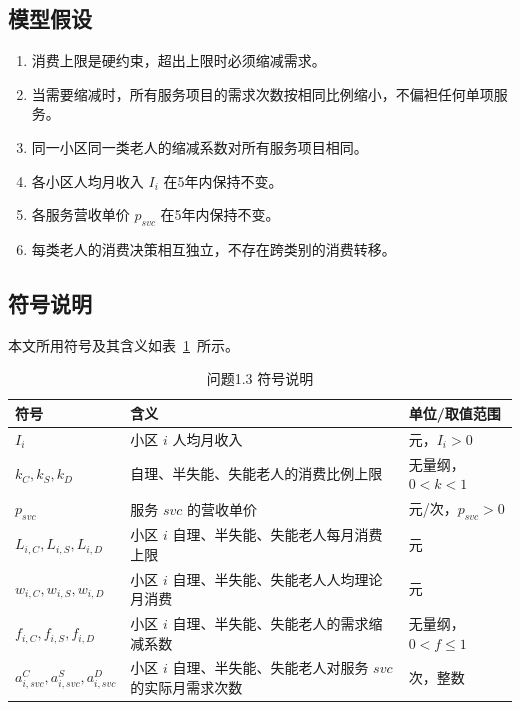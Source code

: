 \documentclass[12pt,a4paper]{article}
\begin{document}
\subsection{模型假设}

\begin{enumerate}
    \item 消费上限是硬约束，超出上限时必须缩减需求。
    \item 当需要缩减时，所有服务项目的需求次数按相同比例缩小，不偏袒任何单项服务。
    \item 同一小区同一类老人的缩减系数对所有服务项目相同。
    \item 各小区人均月收入 $I_i$ 在5年内保持不变。
    \item 各服务营收单价 $p_{svc}$ 在5年内保持不变。
    \item 每类老人的消费决策相互独立，不存在跨类别的消费转移。
\end{enumerate}

\subsection{符号说明}

本文所用符号及其含义如表~\ref{tab:symbols_1.3}~所示。

\begin{table}[htbp]
\centering
\caption{问题1.3 符号说明}
\label{tab:symbols_1.3}
\begin{tabular}{@{} l p{5.5cm} l @{}}
\toprule
符号 & 含义 & 单位/取值范围 \\
\midrule
$I_i$ & 小区 $i$ 人均月收入 & 元，$I_i > 0$ \\
$k_C, k_S, k_D$ & 自理、半失能、失能老人的消费比例上限 & 无量纲，$0 < k < 1$ \\
$p_{svc}$ & 服务 $svc$ 的营收单价 & 元/次，$p_{svc} > 0$ \\
$L_{i,C}, L_{i,S}, L_{i,D}$ & 小区 $i$ 自理、半失能、失能老人每月消费上限 & 元 \\
$w_{i,C}, w_{i,S}, w_{i,D}$ & 小区 $i$ 自理、半失能、失能老人人均理论月消费 & 元 \\
$f_{i,C}, f_{i,S}, f_{i,D}$ & 小区 $i$ 自理、半失能、失能老人的需求缩减系数 & 无量纲，$0 < f \leq 1$ \\
$a_{i,svc}^C, a_{i,svc}^S, a_{i,svc}^D$ & 小区 $i$ 自理、半失能、失能老人对服务 $svc$ 的实际月需求次数 & 次，整数 \\
\bottomrule
\end{tabular}
\end{table}
\end{document}

